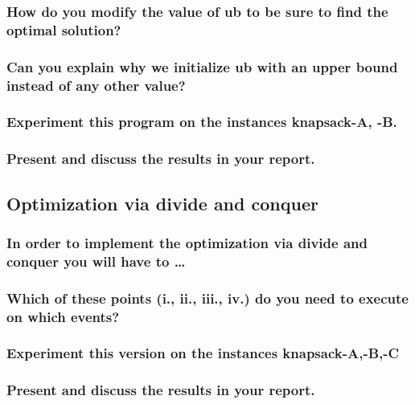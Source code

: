 \documentclass[a4paper ,12pt,french]{article}
\begin{document}
\subsubsection{How do you modify the value of ub to be sure to find the optimal solution?}
\subsubsection{Can you explain why we initialize ub with an upper bound instead of any other value?}
\subsubsection{Experiment this program on the instances knapsack-A, -B. }
\subsubsection{Present and discuss the results in your report.}

\subsection{Optimization via divide and conquer}

\subsubsection{In order to implement the optimization via divide and conquer you will have to \dots}

\subsubsection{Which of these points (i., ii., iii., iv.) do you need to execute on which events?}
\subsubsection{Experiment this version on the instances knapsack-A,-B,-C}
\subsubsection{Present and discuss the results in your report.}
\end{document}
